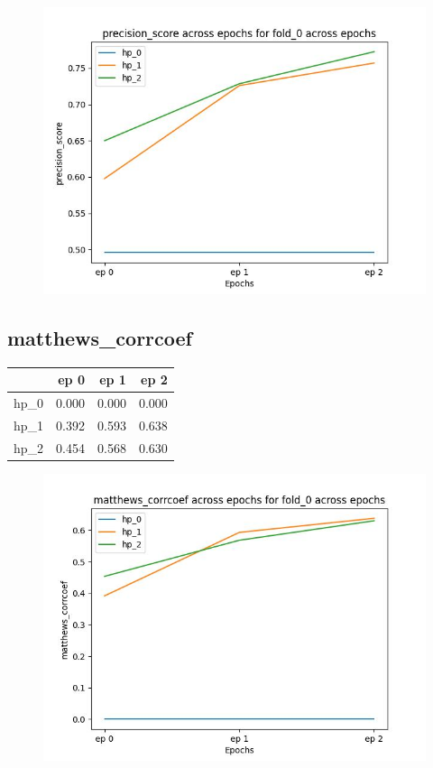 \documentclass{article}
\begin{document}
\begin{figure}[H]
\includegraphics[scale = 0.75]{fold_0/precision_score}
\end{figure}
\subsection{matthews\_corrcoef}
\begin{tabular}{lrrr}
\toprule
{} &   ep 0 &   ep 1 &   ep 2 \\
\midrule
hp\_0 &  0.000 &  0.000 &  0.000 \\
hp\_1 &  0.392 &  0.593 &  0.638 \\
hp\_2 &  0.454 &  0.568 &  0.630 \\
\bottomrule
\end{tabular}

\begin{figure}[H]
\includegraphics[scale = 0.75]{fold_0/matthews_corrcoef}
\end{figure}
\end{document}
